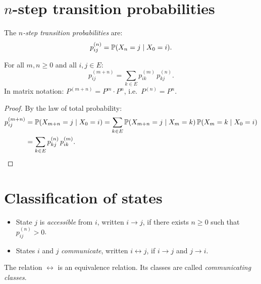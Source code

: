 \section{$n$-step transition probabilities}

\begin{definition}
The \emph{$n$-step transition probabilities} are:
\[
    p_{ij}^{(n)} = \mathbb{P}(X_n = j \mid X_0 = i).
\]
\end{definition}

\begin{theorem}
\label{thm:chapman_kolmogorov}
For all $m, n \geq 0$ and all $i, j \in E$:
\[
    p_{ij}^{(m+n)} = \sum_{k \in E} p_{ik}^{(m)}\, p_{kj}^{(n)}.
\]
In matrix notation: $P^{(m+n)} = P^m \cdot P^n$, i.e.\ $P^{(n)} = P^n$.
\end{theorem}

\begin{proof}
By the law of total probability:
\begin{align*}
    p_{ij}^{(m+n)} &= \mathbb{P}(X_{m+n} = j \mid X_0 = i)
    = \sum_{k \in E} \mathbb{P}(X_{m+n} = j \mid X_m = k)\, \mathbb{P}(X_m = k \mid X_0 = i) \\
    &= \sum_{k \in E} p_{kj}^{(n)}\, p_{ik}^{(m)}.
\end{align*}
\end{proof}

\section{Classification of states}

\begin{definition}
\begin{itemize}
    \item State $j$ is \emph{accessible} from $i$, written $i \to j$, if there
    exists $n \geq 0$ such that $p_{ij}^{(n)} > 0$.
    \item States $i$ and $j$ \emph{communicate}, written $i \leftrightarrow j$, if
    $i \to j$ and $j \to i$.
\end{itemize}
The relation $\leftrightarrow$ is an equivalence relation. Its classes are called
\emph{communicating classes}.
\end{definition}

